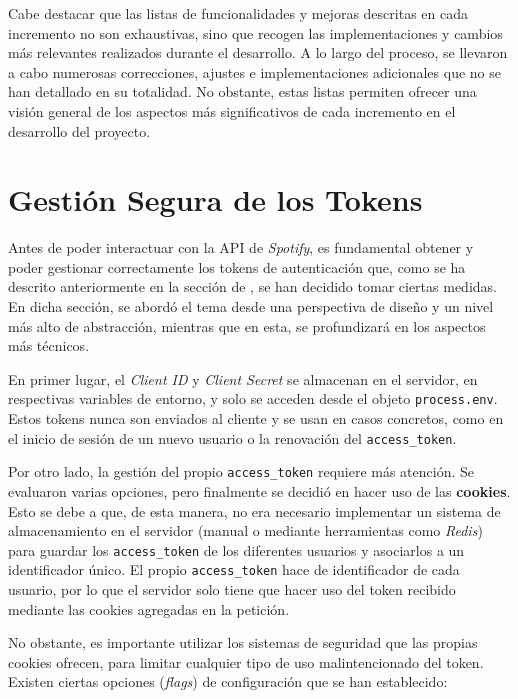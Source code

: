 Cabe destacar que las listas de funcionalidades y mejoras descritas en cada incremento no son exhaustivas, sino que recogen las implementaciones y cambios más relevantes realizados durante el desarrollo. A lo largo del proceso, se llevaron a cabo numerosas correcciones, ajustes e implementaciones adicionales que no se han detallado en su totalidad. No obstante, estas listas permiten ofrecer una visión general de los aspectos más significativos de cada incremento en el desarrollo del proyecto.

\section{Gestión Segura de los Tokens}

Antes de poder interactuar con la API de \textit{Spotify}, es fundamental obtener y poder gestionar correctamente los tokens de autenticación que, como se ha descrito anteriormente en la sección de , se han decidido tomar ciertas medidas. En dicha sección, se abordó el tema desde una perspectiva de diseño y un nivel más alto de abstracción, mientras que en esta, se profundizará en los aspectos más técnicos.

En primer lugar, el \textit{Client ID} y \textit{Client Secret} se almacenan en el servidor, en respectivas variables de entorno, y solo se acceden desde el objeto \texttt{process.env}. Estos tokens nunca son enviados al cliente y se usan en casos concretos, como en el inicio de sesión de un nuevo usuario o la renovación del \texttt{access\_token}.

Por otro lado, la gestión del propio \texttt{access\_token} requiere más atención. Se evaluaron varias opciones, pero finalmente se decidió en hacer uso de las \textbf{cookies}. Esto se debe a que, de esta manera, no era necesario implementar un sistema de almacenamiento en el servidor (manual o mediante herramientas como \textit{Redis}) para guardar los \texttt{access\_token} de los diferentes usuarios y asociarlos a un identificador único. El propio \texttt{access\_token} hace de identificador de cada usuario, por lo que el servidor solo tiene que hacer uso del token recibido mediante las cookies agregadas en la petición.

No obstante, es importante utilizar los sistemas de seguridad que las propias cookies ofrecen, para limitar cualquier tipo de uso malintencionado del token. Existen ciertas opciones (\textit{flags}) de configuración que se han establecido:

